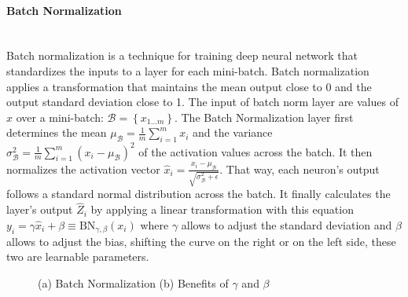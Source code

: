 \documentclass[runningheads]{llncs}
\begin{document}
\paragraph{\large\bf Batch Normalization}\hspace*{\fill} \\
Batch normalization is a technique for training deep neural network that standardizes the inputs to a layer for each mini-batch. Batch normalization applies a transformation that maintains the mean output close to 0 and the output standard deviation close to 1. The input of batch norm layer are values of $x$ over a mini-batch: $ \mathcal{B}=\left\{x_{1 \ldots m}\right\} $. The Batch Normalization layer first determines the mean $\mu_{\mathcal{B}} = \frac{1}{m} \sum_{i=1}^{m} x_{i} $ and the variance $ \sigma_{\mathcal{B}}^{2} = \frac{1}{m} \sum_{i=1}^{m}\left(x_{i}-\mu_{\mathcal{B}}\right)^{2} $ of the activation values across the batch. It then normalizes the activation vector $ \widehat{x}_{i} = \frac{x_{i}-\mu_{\mathcal{B}}}{\sqrt{\sigma_{\mathcal{B}}^{2}+\epsilon}} $. That way, each neuron’s output follows a standard normal distribution across the batch. It finally calculates the layer’s output $ \hat{Z}_{i}$ by applying a linear transformation with this equation $ y_{i} = \gamma \widehat{x}_{i}+\beta \equiv \mathrm{BN}_{\gamma, \beta}\left(x_{i}\right) $ where $\gamma$ allows to adjust the standard deviation and $\beta$ allows to adjust the bias, shifting the curve on the right or on the left side, these two are learnable parameters\cite{bn}.

\begin{figure}[H]
    \centering
    \hspace{1cm}
    \caption{(a) Batch Normalization (b) Benefits of $\gamma$ and $\beta$}
    \label{fig:bn}
\end{figure}
\end{document}
